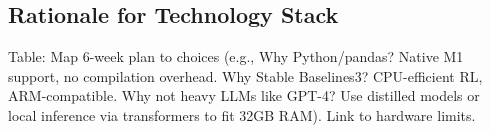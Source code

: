 \subsection{Rationale for Technology Stack}
\label{sec:retionale}

Table: Map 6-week plan to choices (e.g., Why Python/pandas? Native M1 support, no compilation overhead. Why Stable Baselines3? CPU-efficient RL, ARM-compatible. Why not heavy LLMs like GPT-4? Use distilled models or local inference via transformers to fit 32GB RAM). Link to hardware limits.